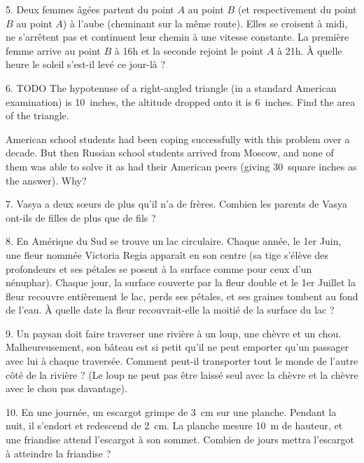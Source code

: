 \begin{problem}{5.}
	Deux femmes âgées partent du point $A$ au point $B$ (et respectivement du point $B$ au point $A$) 
	à l'aube (cheminant sur la même route).
	Elles se croisent à midi, ne s'arrêtent pas et continuent leur chemin à une vitesse constante.
	La première femme arrive au point $B$ à 16h et la seconde rejoint le point $A$ à 21h.
	À quelle heure le soleil s'est-il levé ce jour-là ?
\end{problem}

\begin{problem}{6.}
	TODO
	The hypotenuse of a right-angled triangle (in a standard American examination) is 10~inches,
	the altitude dropped onto it is 6~inches. Find the area of the triangle.

	American school students had been coping successfully with this problem over a decade.
	But then Russian school students arrived from Moscow, and none of them was able to solve it as had their American peers
	(giving 30~square inches as the answer). Why?
\end{problem}

\begin{problem}{7.}
	Vasya a deux s\oe urs de plus qu'il n'a de frères.
	Combien les parents de Vasya ont-ils de filles de plus que de fils ?
\end{problem}

\begin{problem}{8.}
	En Amérique du Sud se trouve un lac circulaire.
	Chaque année, le 1er Juin, une fleur nommée Victoria Regia 
	apparaît en son centre (sa tige s'élève des profondeurs et ses pétales se posent à la surface
	comme pour ceux d'un nénuphar). 
	Chaque jour, la surface couverte par la fleur double et le 1er Juillet la fleur recouvre 
	entièrement le lac, perds ses pétales, et ses graines tombent au fond de l'eau.
	À quelle date la fleur recouvrait-elle la moitié de la surface du lac ?
\end{problem}

\begin{problem}{9.}
	Un paysan doit faire traverser une rivière à un loup, une chèvre et un chou.
	Malheureusement, son bâteau est si petit qu'il ne peut emporter qu'un passager avec lui à 
	chaque traversée.
	Comment peut-il transporter tout le monde de l'autre côté de la rivière ?
	(Le loup ne peut pas être laissé seul avec la chèvre et la chèvre avec le chou pas davantage).
\end{problem}

\begin{problem}{10.}
	En une journée, un escargot grimpe de \SI{3}{\cm} sur une planche. 
	Pendant la nuit, il s'endort et redescend de \SI{2}{\cm}.
	La planche mesure \SI{10}{\metre} de hauteur, et une friandise attend l'escargot à son sommet.
	Combien de jours mettra l'escargot à atteindre la friandise ?
\end{problem}

